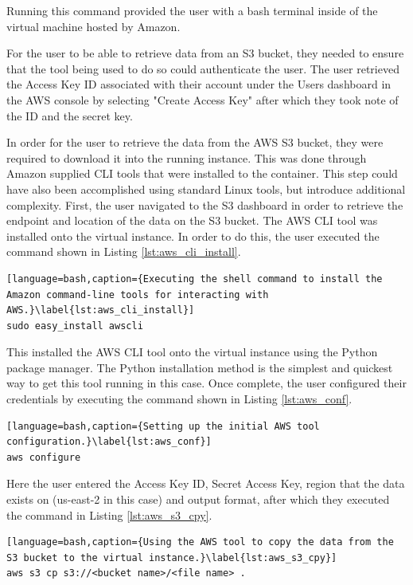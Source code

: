Running this command provided the user with a bash terminal inside of the virtual machine hosted by Amazon.

For the user to be able to retrieve data from an S3 bucket, they needed to ensure that the tool being used to do so could authenticate the user. The user retrieved the Access Key ID associated with their account under the Users dashboard in the AWS console by selecting "Create Access Key" after which they took note of the ID and the secret key.

In order for the user to retrieve the data from the AWS S3 bucket, they were required to download it into the running instance. This was done through Amazon supplied CLI tools that were installed to the container. This step could have also been accomplished using standard Linux tools, but introduce additional complexity. First, the user navigated to the S3 dashboard in order to retrieve the endpoint and location of the data on the S3 bucket. The AWS CLI tool was installed onto the virtual instance. In order to do this, the user executed the command shown in Listing \ref{lst:aws_cli_install}.

\begin{lstlisting}[language=bash,caption={Executing the shell command to install the Amazon command-line tools for interacting with AWS.}\label{lst:aws_cli_install}]
sudo easy_install awscli
\end{lstlisting}

This installed the AWS CLI tool onto the virtual instance using the Python package manager. The Python installation method is the simplest and quickest way to get this tool running in this case. Once complete, the user configured their credentials by executing the command shown in Listing \ref{lst:aws_conf}.

\begin{lstlisting}[language=bash,caption={Setting up the initial AWS tool configuration.}\label{lst:aws_conf}]
aws configure
\end{lstlisting}

Here the user entered the Access Key ID, Secret Access Key, region that the data exists on (us-east-2 in this case) and output format, after which they executed the command in Listing \ref{lst:aws_s3_cpy}.

\begin{lstlisting}[language=bash,caption={Using the AWS tool to copy the data from the S3 bucket to the virtual instance.}\label{lst:aws_s3_cpy}]
aws s3 cp s3://<bucket name>/<file name> .
\end{lstlisting}

